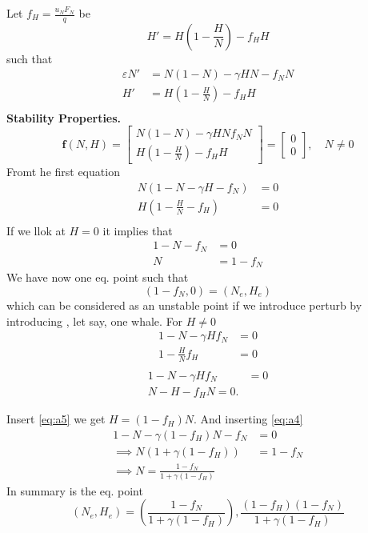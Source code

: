 \documentclass{article}
\theoremstyle{remark}
\begin{document}
  Let $f_{H} = \frac{u_{N} F_{N}}{q} $ be \[
  H'  = H\left( 1 - \frac{H}{N} \right) - f_{H} H
  \] 
  such that \[
    \begin{split}
  \varepsilon N'  &=  N\left( 1 - N \right) - \gamma HN - f_{N} N \\
  H'  &=  H\left( 1 - \frac{H}{N} \right) - f_{H} H \\
    \end{split} 
  \] 
  \textbf{Stability Properties.}  \[
  \mathbf{f}\left( N,H \right) = \begin{bmatrix} 
  N\left(  1 - N  \right)  - \gamma  HN f_{N} N \\
  H\left( 1 - \frac{H}{N} \right) - f_{H} H
  \end{bmatrix} 
   = \begin{bmatrix} 
   0 \\
   0
   \end{bmatrix} 
  , \quad  N\neq0  
  \] 
  Fromt he first equation \[
    \begin{split}
  N\left( 1- N - \gamma  H - f_{N} \right)  &=  0 \\
  H\left( 1- \frac{H}{N} - f_{H} \right) &=  0 \\
    \end{split} 
  \] 
  If we llok at $H = 0$ it implies that \[
    \begin{split}
  1 - N - f_{N} &=  0 \\
 N  & = 1 - f_{N}
    \end{split} 
  \] 
  We have now one eq. point such that \[
    \left( 1 - f_{N}, 0 \right) = \left( N_{e}, H_{e} \right)
  \] 
  which can be considered as an unstable point if we introduce perturb by introducing , let say, one whale.  For $H\neq 0$ \[
  \begin{split}
    1 - N - \gamma  H f_{N} &=  0 \\
    1 - \frac{H}{N}  f_{H} &=  0 \\
  \end{split} 
  \] 
  \begin{align}
      \label{eq:a4}
      1- N - \gamma  H f_{N} &=  0  \\
      \label{eq:a5}
      N - H - f_{H} N = 0
  .\end{align}

  Insert \eqref{eq:a5}  we get $ H = \left( 1 - f _{H}  \right) N$. And inserting \eqref{eq:a4}  \[
    \begin{split}
  1 - N - \gamma  \left( 1 - f_{H} \right) N - f_{N} &=  0 \\
  \implies  N\left(  1 + \gamma  \left(  1 - f_{H} \right) \right)  & = 1- f_{N} \\
  \implies  N = \frac{1 - f_{N}}{ 1 + \gamma  \left(  1 - f_{H} \right)} 
    \end{split} 
  \] 
  In summary is the eq. point \[
  \left( N_{e}, H _{e} \right) = \left(  \frac{1 - f_{N}}{ 1 + \gamma  \left( 1 - f_{H} \right)}  \right) , \frac{\left( 1 - f_{H} \right) \left( 1 - f_{N} \right)}{ 1 + \gamma  \left( 1 - f_{H} \right)} 
  \] 
\end{document}
